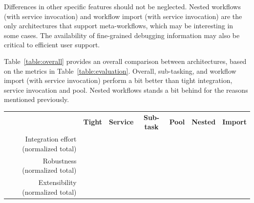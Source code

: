 \documentclass[preprint,3p,twocolumn]{elsarticle}
\begin{document}
Differences in other specific features should not be neglected. Nested
workflows (with service invocation) and workflow import (with service
invocation) are the only architectures that support meta-workflows,
which may be interesting in some cases. The availability of
fine-grained debugging information may also be critical to efficient
user support.

Table~\ref{table:overall} provides an overall comparison between
architectures, based on the metrics in Table~\ref{table:evaluation}.
Overall, sub-tasking, and workflow import (with service invocation)
perform a bit better than tight integration, service invocation and
pool. Nested workflows stands a bit behind for the reasons mentioned
previously.
\begin{table}
\centering
\begin{tabular}{rcccccc}
                                    & \textbf{Tight}
                                    & \textbf{Service}
                                    & \textbf{Sub-task}
                                    & \textbf{Pool}
                                    & \textbf{Nested}
                                    & \textbf{Import} \\
  Integration effort (normalized total) &
                                    \cellcolor[HTML]{99FF99}{0.00}
                                    & \cellcolor[HTML]{99EF99}{0.22}
                                    & \cellcolor[HTML]{99FF99}{0.00}
                                    & \cellcolor[HTML]{99E099}{0.44}
                                    & \cellcolor[HTML]{99BB99}{1.00}
                                      & \cellcolor[HTML]{99E899}{0.33}\\
Robustness (normalized total) &
                                \cellcolor[HTML]{99F599}{0.14}
                                    & \cellcolor[HTML]{99E199}{0.43}
                                    & \cellcolor[HTML]{99FF99}{0.00}
                                    & \cellcolor[HTML]{99CE99}{0.71}
                                    & \cellcolor[HTML]{99BB99}{1.00}
                                    & \cellcolor[HTML]{99E199}{0.43}\\
  Extensibility (normalized total)  & \cellcolor[HTML]{99E099}{0.44}
                                     & \cellcolor[HTML]{99E099}{0.44}
                                     & \cellcolor[HTML]{99FF99}{0.00}
                                     & \cellcolor[HTML]{99EF99}{0.22}
                                     & \cellcolor[HTML]{99BB99}{1.00}
                                     & \cellcolor[HTML]{99EF99}{0.22}\\

\end{tabular}
\end{table}
\end{document}
